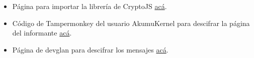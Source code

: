 \documentclass[letter,12pt]{article}
\begin{document}
\begin{itemize}
    \item Página para importar la librería de CryptoJS \href{https://cdnjs.com/libraries/crypto-js}{acá}.

    \item Código de Tampermonkey del usuario AkumuKernel para descifrar la página del informante \href{https://greasyfork.org/es/scripts/479454-cryptojs/code}{acá}.

    \item Página de devglan para descifrar los mensajes \href{https://www.devglan.com/online-tools/triple-des-encrypt-decrypt}{acá}.
    


\end{itemize}
\end{document}
